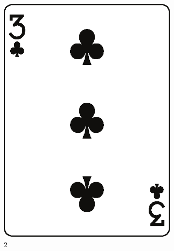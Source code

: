 \documentclass[10pt]{beamer}
\begin{document}
\begin{frame}
\begin{columns}
\begin{column}{7cm}
\begin{figure}
\begin{subfigure}{.15\linewidth}
      \includegraphics[width=\linewidth]{im/clubs_3.eps}
      \caption{2}
     \end{subfigure}
     \begin{subfigure}{.15\linewidth}

\end{subfigure}
\end{figure}
\end{column}
\end{columns}
\end{frame}
\end{document}
